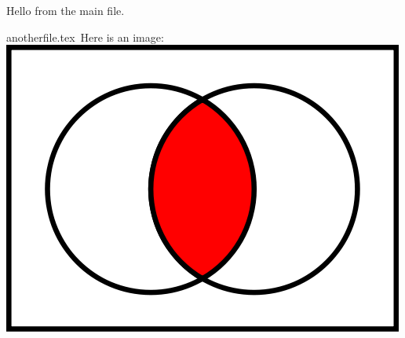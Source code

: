 \documentclass{article}
\def\fname{anotherfile.tex} %
\begin{document}
Hello from the main file.

\fname\
Here is an image:
\includegraphics[scale=0.25]{AcapB}
\end{document}
